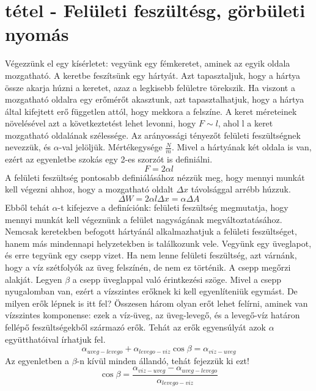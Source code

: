 \documentclass[a4paper,12pt]{article}
\begin{document}
\section{ tétel - Felületi feszültésg, görbületi nyomás}
Végezzünk el egy kísérletet: vegyünk egy fémkeretet, aminek az egyik oldala mozgatható. A keretbe feszítsünk egy hártyát. Azt tapasztaljuk, hogy a hártya össze akarja húzni a keretet, azaz a legkisebb felületre törekszik. Ha viszont a mozgatható oldalra egy erőmérőt akasztunk, azt tapasztalhatjuk, hogy a hártya által kifejtett erő független attól, hogy mekkora a felszíne. A keret méreteinek növelésével azt a következtetést lehet levonni, hogy $F\sim l$, ahol l a keret mozgatható oldalának szélessége. Az arányossági tényezőt felületi feszültségnek nevezzük, és $\alpha$-val jelöljük. Mértékegysége $\frac{N}{m}$. Mivel a hártyának két oldala is van, ezért az egyenletbe szokás egy 2-es szorzót is definiálni.
\begin{equation}
F=2\alpha l
\end{equation}
A felületi feszültség pontosabb definiálásához nézzük meg, hogy mennyi munkát kell végezni ahhoz, hogy a mozgatható oldalt $\Delta x$ távolsággal arrébb húzzuk.
\begin{equation}
\Delta W=2\alpha l\Delta x=\alpha\Delta A
\end{equation}
Ebből tehát $\alpha$-t kifejezve a definíciónk: felületi feszültség megmutatja, hogy mennyi munkát kell végeznünk a felület nagyságának megváltoztatásához.
Nemcsak keretekben befogott hártyánál alkalmazhatjuk a felületi feszültséget, hanem más mindennapi helyzetekben is találkozunk vele. Vegyünk egy üveglapot, és erre tegyünk egy csepp vizet. Ha nem lenne felületi feszültség, azt várnánk, hogy a víz szétfolyók az üveg felszínén, de nem ez történik. A csepp megőrzi alakját. Legyen $\beta$ a csepp üveglappal való érintkezési szöge. Mivel a csepp nyugalomban van, ezért a vízszintes erőknek ki kell egyenlíteniük egymást. De milyen erők lépnek is itt fel? Összesen három olyan erőt lehet felírni, aminek van vízszintes komponense: ezek a víz-üveg, az üveg-levegő, és a levegő-víz határon fellépő feszültségekből származó erők. Tehát az erők egyensúlyát azok $\alpha$ együtthatóival írhatjuk fel.
\begin{equation}
\alpha_{uveg-levego}+\alpha_{levego-viz}\cos\beta=\alpha_{viz-uveg}
\end{equation}
Az egyenletben a $\beta$-n kívül minden állandó, tehát fejezzük ki ezt!
\begin{equation}
\cos\beta=\frac{\alpha_{viz-uveg}-\alpha_{uveg-levego}}{\alpha_{levego-viz}}
\end{equation}
\end{document}
